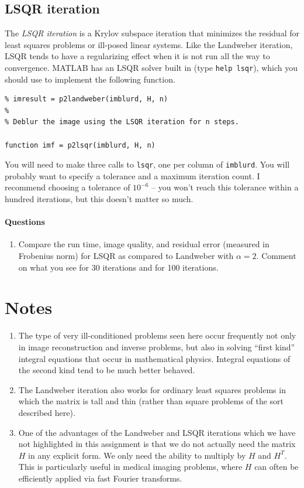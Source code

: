 \documentclass[12pt, leqno]{article} %
\begin{document}
\subsection{LSQR iteration}

The {\em LSQR iteration} is a Krylov subspace iteration that minimizes
the residual for least squares problems or ill-posed linear systems.
Like the Landweber iteration, LSQR tends to have a regularizing effect
when it is not run all the way to convergence.  MATLAB has an LSQR
solver built in (type {\tt help lsqr}), which you should use to
implement the following function.
\begin{lstlisting}
% imresult = p2landweber(imblurd, H, n)
%
% Deblur the image using the LSQR iteration for n steps.

function imf = p2lsqr(imblurd, H, n)
\end{lstlisting}
You will need to make three calls to {\tt lsqr}, one per column of
{\tt imblurd}.  You will probably want to specify a tolerance and
a maximum iteration count.  I recommend choosing a tolerance of
$10^{-6}$ -- you won't reach this tolerance within a hundred
iterations, but this doesn't matter so much.

\paragraph*{Questions}

\begin{enumerate}
\item
  Compare the run time, image quality, and residual error (measured in
  Frobenius norm) for LSQR as compared to Landweber with $\alpha = 2$.
  Comment on what you see for 30 iterations and for 100 iterations.
\end{enumerate}

\section{Notes}

\begin{enumerate}
\item
  The type of very ill-conditioned problems seen here occur frequently
  not only in image reconstruction and inverse problems, but also in
  solving ``first kind'' integral equations that occur in mathematical
  physics.  Integral equations of the second kind tend to be much
  better behaved.
\item
  The Landweber iteration also works for ordinary least squares
  problems in which the matrix is tall and thin (rather than
  square problems of the sort described here).
\item
  One of the advantages of the Landweber and LSQR iterations which we have
  not highlighted in this assignment is that we do not actually need
  the matrix $H$ in any explicit form.  We only need the ability to
  multiply by $H$ and $H^T$.  This is particularly useful in medical
  imaging problems, where $H$ can often be efficiently applied via
  fast Fourier transforms.
\end{enumerate}
\end{document}
